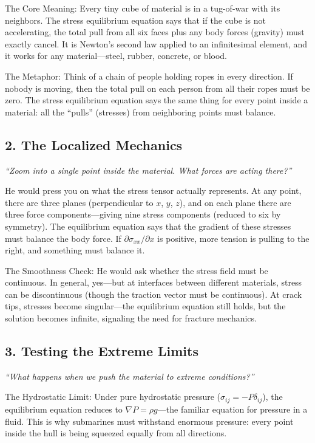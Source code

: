 \documentclass[11pt,openright]{book}
\begin{document}
The Core Meaning: Every tiny cube of material is in a tug-of-war with its neighbors. The stress equilibrium equation says that if the cube is not accelerating, the total pull from all six faces plus any body forces (gravity) must exactly cancel. It is Newton's second law applied to an infinitesimal element, and it works for any material---steel, rubber, concrete, or blood.

The Metaphor: Think of a chain of people holding ropes in every direction. If nobody is moving, then the total pull on each person from all their ropes must be zero. The stress equilibrium equation says the same thing for every point inside a material: all the ``pulls'' (stresses) from neighboring points must balance.

\subsection*{2. The Localized Mechanics}
\textit{``Zoom into a single point inside the material. What forces are acting there?''}

He would press you on what the stress tensor actually represents. At any point, there are three planes (perpendicular to $x$, $y$, $z$), and on each plane there are three force components---giving nine stress components (reduced to six by symmetry). The equilibrium equation says that the gradient of these stresses must balance the body force. If $\partial \sigma_{xx}/\partial x$ is positive, more tension is pulling to the right, and something must balance it.

The Smoothness Check: He would ask whether the stress field must be continuous. In general, yes---but at interfaces between different materials, stress can be discontinuous (though the traction vector must be continuous). At crack tips, stresses become singular---the equilibrium equation still holds, but the solution becomes infinite, signaling the need for fracture mechanics.

\subsection*{3. Testing the Extreme Limits}
\textit{``What happens when we push the material to extreme conditions?''}

The Hydrostatic Limit: Under pure hydrostatic pressure ($\sigma_{ij} = -P\delta_{ij}$), the equilibrium equation reduces to $\nabla P = \rho g$---the familiar equation for pressure in a fluid. This is why submarines must withstand enormous pressure: every point inside the hull is being squeezed equally from all directions.
\end{document}
